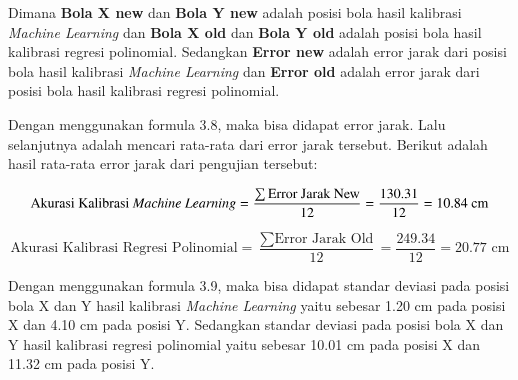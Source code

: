 Dimana \textbf{Bola X new} dan \textbf{Bola Y new} adalah posisi bola hasil kalibrasi \emph{Machine Learning} dan \textbf{Bola X old} dan \textbf{Bola Y old} adalah posisi bola hasil kalibrasi regresi polinomial. Sedangkan \textbf{Error new} adalah error jarak dari posisi bola hasil kalibrasi \emph{Machine Learning} dan \textbf{Error old} adalah error jarak dari posisi bola hasil kalibrasi regresi polinomial.

Dengan menggunakan formula 3.8, maka bisa didapat error jarak. Lalu selanjutnya adalah mencari rata-rata dari error jarak tersebut. Berikut adalah hasil rata-rata error jarak dari pengujian tersebut: 

\begin{equation}
  \text{Akurasi Kalibrasi \emph{Machine Learning}} = \frac{\sum \text{Error Jarak New}}{12} = \frac{130.31}{12} = 10.84 \text{ cm}
\end{equation}

\begin{equation}
  \text{Akurasi Kalibrasi Regresi Polinomial} = \frac{\sum \text{Error Jarak Old}}{12} = \frac{249.34}{12} = 20.77 \text{ cm}
\end{equation}

Dengan menggunakan formula 3.9, maka bisa didapat standar deviasi pada posisi bola X dan Y hasil kalibrasi \emph{Machine Learning} yaitu sebesar 1.20 cm pada posisi X dan 4.10 cm pada posisi Y. Sedangkan standar deviasi pada posisi bola X dan Y hasil kalibrasi regresi polinomial yaitu sebesar 10.01 cm pada posisi X dan 11.32 cm pada posisi Y.

